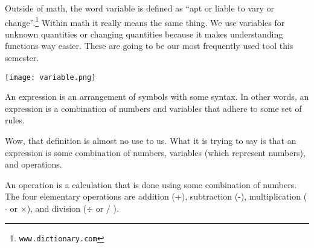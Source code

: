 Outside of math, the word variable is defined as ``apt or liable to vary or change''.\footnote{\texttt{www.dictionary.com}} Within math it really means the same thing. We use variables for unknown quantities or changing quantities because it makes understanding functions way easier. These are going to be our most frequently used tool this semester. 

\begin{center}
\texttt{[image: variable.png]}
\end{center}

\begin{defn}[Expression]
	An expression is an arrangement of symbols with some syntax. In other words, an expression is a combination of numbers and variables that adhere to some set of rules. 
\end{defn}

Wow, that definition is almost no use to us. What it is trying to say is that an expression is some combination of numbers, variables (which represent numbers), and operations. 

\begin{defn}
An operation is a calculation that is done using some combination of numbers. The four elementary operations are addition (+), subtraction (-), multiplication ( $\cdot$ or $\times$), and division ($\div$ or $/$ ).
\end{defn}

%	



